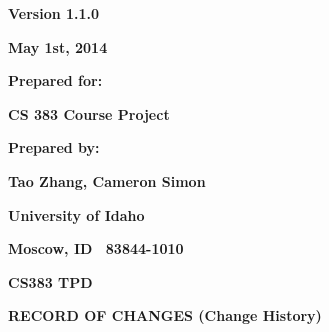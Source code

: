 \bigskip


\bigskip


\bigskip


\bigskip

{\centering{}\bfseries\color{black}
Version 1.1.0
\par}

{\centering{}\bfseries\color{black}
May 1st, 2014
\par}


\bigskip


\bigskip

{\centering{}\bfseries\color{black}
Prepared for:
\par}

{\centering{}\bfseries\color{black}
CS 383 Course Project
\par}


\bigskip


\bigskip

{\centering{}\bfseries\color{black}
Prepared by:
\par}

{\centering{}\bfseries\color{black}
Tao Zhang, Cameron Simon
\par}

{\centering{}\bfseries\color{black}
University of Idaho
\par}

{\centering{}\bfseries\color{black}
Moscow, ID \ 83844-1010
\par}

{\centering{}\bfseries\color{black}
CS383 TPD
\par}

\pagebreak

{\centering{}\bfseries\color{black}
RECORD OF CHANGES (Change History)
\par}

